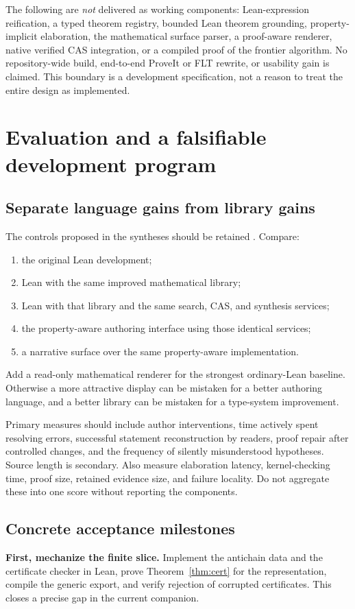 \documentclass[11pt,a4paper]{article}
\theoremstyle{definition}\newtheorem{definition}[theorem]{Definition}
\theoremstyle{remark}\newtheorem{remark}[theorem]{Remark}
\begin{document}
The following are \emph{not} delivered as working components: Lean-expression reification, a typed theorem registry, bounded Lean theorem grounding, property-implicit elaboration, the mathematical surface parser, a proof-aware renderer, native verified CAS integration, or a compiled proof of the frontier algorithm. No repository-wide build, end-to-end ProveIt or FLT rewrite, or usability gain is claimed. This boundary is a development specification, not a reason to treat the entire design as implemented.

\section{Evaluation and a falsifiable development program}
\label{sec:evaluation}
\subsection{Separate language gains from library gains}
The controls proposed in the syntheses should be retained \cite{synA,synB}. Compare:
\begin{enumerate}
\item the original Lean development;
\item Lean with the same improved mathematical library;
\item Lean with that library and the same search, CAS, and synthesis services;
\item the property-aware authoring interface using those identical services;
\item a narrative surface over the same property-aware implementation.
\end{enumerate}
Add a read-only mathematical renderer for the strongest ordinary-Lean baseline. Otherwise a more attractive display can be mistaken for a better authoring language, and a better library can be mistaken for a type-system improvement.

Primary measures should include author interventions, time actively spent resolving errors, successful statement reconstruction by readers, proof repair after controlled changes, and the frequency of silently misunderstood hypotheses. Source length is secondary. Also measure elaboration latency, kernel-checking time, proof size, retained evidence size, and failure locality. Do not aggregate these into one score without reporting the components.

\subsection{Concrete acceptance milestones}
\textbf{First, mechanize the finite slice.} Implement the antichain data and the certificate checker in Lean, prove Theorem~\ref{thm:cert} for the representation, compile the generic export, and verify rejection of corrupted certificates. This closes a precise gap in the current companion.
\end{document}
